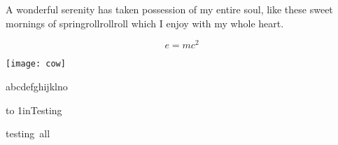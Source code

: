 \documentclass{article}
\begin{document}
\hsize 3in
A wonderful serenity has taken possession of my entire soul, like these sweet
mornings of springrollrollroll which I enjoy with my whole heart.

$$ e=mc^2 $$

\centerline{\texttt{[image: cow]}}


abcdefghijklno

\noindent
\vbox to 1in{Testing}


\hbox{\vbox{\lipsum[1]}testing all}
\end{document}

